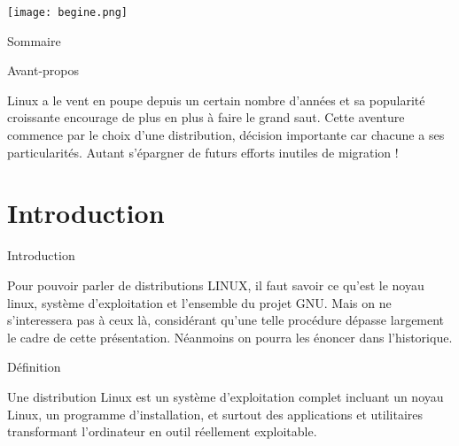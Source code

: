 \documentclass{beamer}
\begin{document}
%

\begin{frame}
\begin{center}
\texttt{[image: begine.png]}
\end{center}
\end{frame}


\begin{frame}{Sommaire}
  \tableofcontents
\end{frame}

\begin{frame}{Avant-propos}
 \begin{block}
\raggedright Linux a le vent en poupe depuis un certain nombre d'années et sa popularité croissante encourage de plus en plus à faire le grand saut. Cette aventure commence par le choix d'une distribution, décision importante car chacune a ses particularités. Autant s'épargner de futurs efforts inutiles de migration !
\end{block}  
\end{frame}
\section{Introduction}
\begin{frame}{Introduction}
\begin{block}
\raggedright 
Pour pouvoir parler de distributions LINUX, il faut savoir ce qu'est le noyau linux, système d'exploitation et l'ensemble du projet GNU. Mais on ne s'interessera pas à ceux là, considérant qu'une telle procédure dépasse largement le cadre de cette présentation. Néanmoins on pourra les énoncer dans l'historique.  
\end{block}
\end{frame}

\begin{frame}{}
\begin{block}{Définition}
\raggedright 
Une distribution Linux est un système d'exploitation complet incluant un noyau Linux, un programme d'installation, et surtout des applications et utilitaires transformant l'ordinateur en outil réellement exploitable.
\end{block}
\end{frame}
\end{document}
